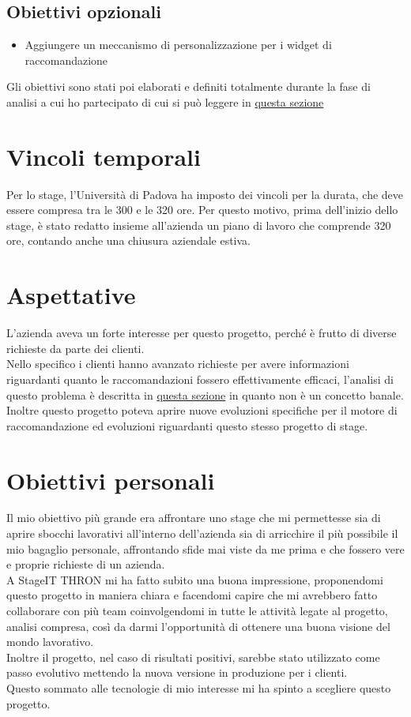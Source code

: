 \documentclass[a4paper, 12pt, twoside, openright]{book}
\begin{document}
\subsection{Obiettivi opzionali}
\begin{itemize}
\item Aggiungere un meccanismo di personalizzazione per i widget di raccomandazione
\end{itemize}

Gli obiettivi sono stati poi elaborati e definiti totalmente durante la fase di analisi a cui ho partecipato di cui si può leggere in \hyperref[analisi]{questa sezione}

\section{Vincoli temporali}
Per lo stage, l'Università di Padova ha imposto dei vincoli per la durata, che deve essere compresa tra le 300 e le 320 ore. Per questo motivo, prima dell'inizio dello stage, è stato redatto insieme all'azienda un piano di lavoro che comprende 320 ore, contando anche una chiusura aziendale estiva.

\section{Aspettative}
L'azienda aveva un forte interesse per questo progetto, perché è frutto di diverse richieste da parte dei clienti.\\
Nello specifico i clienti hanno avanzato richieste per avere informazioni riguardanti quanto le raccomandazioni fossero effettivamente efficaci, l'analisi di questo problema è descritta in \hyperref[analisi-pcr]{questa sezione} in quanto non è un concetto banale.\\
Inoltre questo progetto poteva aprire nuove evoluzioni specifiche per il motore di raccomandazione ed evoluzioni riguardanti questo stesso progetto di stage.

\section{Obiettivi personali}
Il mio obiettivo più grande era affrontare uno stage che mi permettesse sia di aprire sbocchi lavorativi all'interno dell'azienda sia di arricchire il più possibile il mio bagaglio personale, affrontando sfide mai viste da me prima e che fossero vere e proprie richieste di un azienda.\\
A StageIT THRON mi ha fatto subito una buona impressione, proponendomi questo progetto in maniera chiara e facendomi capire che mi avrebbero fatto collaborare con più team coinvolgendomi in tutte le attività legate al progetto, analisi compresa, così da darmi l'opportunità di ottenere una buona visione del mondo lavorativo.\\
Inoltre il progetto, nel caso di risultati positivi, sarebbe stato utilizzato come passo evolutivo mettendo la nuova versione in produzione per i clienti.\\
Questo sommato alle tecnologie di mio interesse mi ha spinto a scegliere questo progetto.
\end{document}
